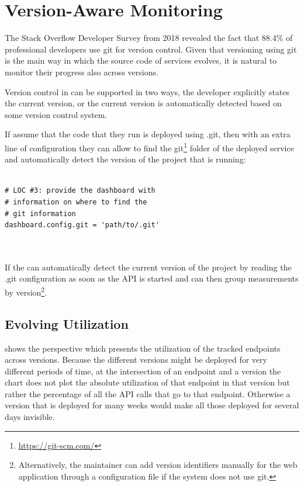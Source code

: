  
  \section{Version-Aware Monitoring}
  
  The Stack Overflow Developer Survey from 2018 revealed the fact that 88.4\% of professional developers use git for version control. 
  Given that versioning using git is the main way in which the source code of services evolves, it is natural to monitor their progress also across versions. 

  Version control in \tool can be supported in two ways,
  the developer explicitly states the current version, 
  or the current version is automatically detected based
  on some version control system. 



  If assume that the code that they run is deployed using .git, then with an extra line of configuration they can allow \tool to find the git\footnote{\url{https://git-scm.com/}} folder of the deployed service and automatically detect the version of the project that is running: 
    
\begin{lstlisting}[style=custompython]

# LOC #3: provide the dashboard with 
# information on where to find the 
# git information 
dashboard.config.git = 'path/to/.git'
  
      
\end{lstlisting}  
 
  If the \tool can automatically detect the current version of the project by reading the .git configuration as soon as the API is started and can then group measurements by version\footnote{Alternatively, the maintainer can add version identifiers manually for the web application through a configuration file if the system does not use git.}. 


  

  \subsection*{Evolving Utilization}

   shows the  perspective which presents the utilization of the tracked endpoints across versions. Because the different versions might be deployed for very different periods of time, at the intersection of an endpoint and a version the chart does not plot the absolute utilization of that endpoint in that version but rather the percentage of all the API calls that go to that endpoint. Otherwise a version that is deployed for many weeks would make all those deployed for several days invisible.


